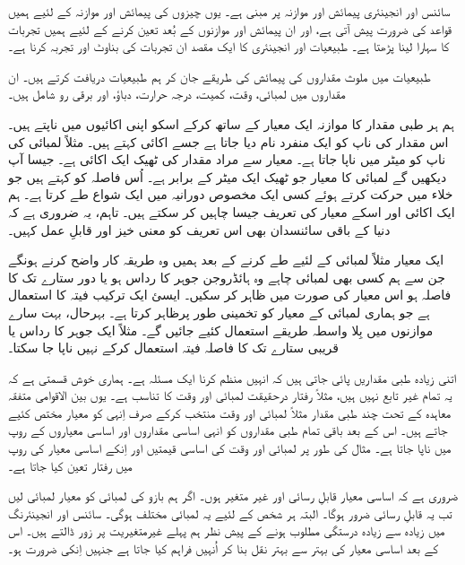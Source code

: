 	سائنس اور انجینئری پیمائش اور موازنہ پر مبنی ہے۔ یوں چیزوں کی پیمائش اور موازنہ کے لئیے ہمیں قواعد کی ضرورت پیش آتی ہے، اور ان پیمائش اور موازنوں کے بُعد تعین کرنے کے لئیے ہمیں تجربات کا سہارا لینا پڑھتا ہے۔ طبیعیات اور انجینئری کا ایک مقصد ان تجربات کی بناوٹ اور تجربہ کرنا ہے۔
	
	طبیعیات میں ملوث مقداروں کی پیمائش کی طریقے جان کر ہم طبیعیات دریافت کرتے ہیں۔ ان مقداروں میں لمبائی، وقت، کمیت، درجہ حرارت، دباؤ، اور برقی رو شامل ہیں۔
	
	ہم ہر طبی مقدار کا موازنہ ایک معیار کے ساتھ کرکے اسکو اپنی اکائیوں میں ناپتے ہیں۔ اس مقدار کی ناپ کو ایک منفرد نام دیا جاتا ہے جسے اکائی کہتے ہیں۔ مثلاً لمبائی کی ناپ کو میٹر میں ناپا جاتا ہے۔ معیار سے مراد مقدار کی ٹھیک ایک اکائی ہے۔ جیسا آپ دیکھیں گے لمبائی کا معیار جو ٹھیک ایک میٹر کے برابر ہے۔ اُس فاصلہ کو کہتے ہیں جو خلاء میں حرکت کرتے ہوئے کسی ایک مخصوص دورانیہ میں ایک شواع طے کرتا ہے۔ ہم ایک اکائی اور اسکے معیار کی تعریف جیسا چاہیں کر سکتے ہیں۔ تاہم، یہ ضروری ہے کہ دنیا کے باقی سائنسدان بھی اس تعریف کو معنی خیز اور قابلِ عمل کہیں۔
	
	ایک معیار مثلاً لمبائی کے لئیے طے کرنے کے بعد ہمیں وہ طریقہ کار واضح کرنے ہونگے جن سے ہم کسی بھی لمبائی چاہے وہ ہائڈروجن جوہر کا رداس ہو یا دور ستارے تک کا فاصلہ ہو اس معیار کی صورت میں ظاہر کر سکیں۔ ایسئ ایک ترکیب فیتہ کا استعمال ہے جو ہماری لمبائی کے معیار کو تخمینی طور پرظاہر کرتا ہے۔ بہرحال، بہت سارے موازنوں میں بِلا واسطہ طریقے استعمال کئیے جائیں گے۔ مثلاً ایک جوہر کا رداس یا قریبی ستارے تک کا فاصلہ فیتہ استعمال کرکے نہیں ناپا جا سکتا۔
	
	اتنی زیادہ طبی مقداریں پائی جاتی ہیں کہ انہیں منظم کرنا ایک مسئلہ ہے۔ ہماری خوش قسمتی ہے کہ یہ تمام غیر تابع نہیں ہیں، مثلاً رفتار درحقیقت لمبائی اور وقت کا تناسب ہے۔ یوں بین الاقوامی متفقہ معاہدہ کے تحت چند طبی مقدار مثلاً لمبائی اور وقت منتخب کرکے صرف اِنہی کو معیار مختص کئیے جاتے ہیں۔ اس کے بعد باقی تمام طبی مقداروں کو انہی اساسی مقداروں اور اساسی معیاروں کے روپ میں ناپا جاتا ہے۔ مثال کی طور پر لمبائی اور وقت کی اساسی قیمتیں اور اِنکے اساسی معیار کی روپ میں رفتار تعین کیا جاتا ہے۔
	
	ضروری ہے کہ اساسی معیار قابلِ رسائی اور غیر متغیر ہوں۔ اگر ہم بازو کی لمبائی کو معیار لمبائی لیں تب یہ قابلِ رسائی ضرور ہوگا۔ البتہ ہر شخص کے لئیے یہ لمبائی مختلف ہوگی۔ سائنس اور انجینئرنگ میں زیادہ سے زیادہ درستگی مطلوب ہونے کے پیش نظر ہم پہلے غیرمتغیریت پر زور ڈالتے ہیں۔ اس کے بعد اساسی معیار کی بہتر سے بہتر نقل بنا کر اُنہیں فراہم کیا جاتا ہے جنہیں اِنکی ضرورت ہو۔


